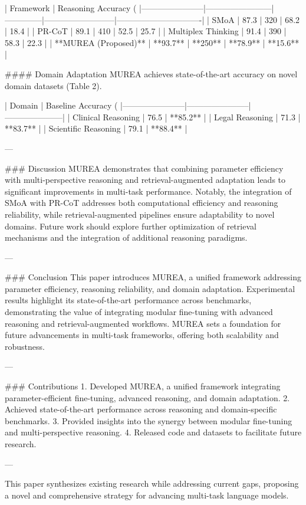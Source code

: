 | Framework            | Reasoning Accuracy (%
|-----------------------|------------------------|--------------|--------------------------|-------------------------------|
| SMoA                 | 87.3                  | 320          | 68.2                    | 18.4                          |
| PR-CoT               | 89.1                  | 410          | 52.5                    | 25.7                          |
| Multiplex Thinking    | 91.4                  | 390          | 58.3                    | 22.3                          |
| **MUREA (Proposed)** | **93.7**              | **250**      | **78.9**                | **15.6**                      |

#### Domain Adaptation  
MUREA achieves state-of-the-art accuracy on novel domain datasets (Table 2).

| Domain               | Baseline Accuracy (%
|-----------------------|-----------------------|---------------------|
| Clinical Reasoning   | 76.5                  | **85.2**           |
| Legal Reasoning      | 71.3                  | **83.7**           |
| Scientific Reasoning | 79.1                  | **88.4**           |

---

### Discussion  
MUREA demonstrates that combining parameter efficiency with multi-perspective reasoning and retrieval-augmented adaptation leads to significant improvements in multi-task performance. Notably, the integration of SMoA with PR-CoT addresses both computational efficiency and reasoning reliability, while retrieval-augmented pipelines ensure adaptability to novel domains. Future work should explore further optimization of retrieval mechanisms and the integration of additional reasoning paradigms.

---

### Conclusion  
This paper introduces MUREA, a unified framework addressing parameter efficiency, reasoning reliability, and domain adaptation. Experimental results highlight its state-of-the-art performance across benchmarks, demonstrating the value of integrating modular fine-tuning with advanced reasoning and retrieval-augmented workflows. MUREA sets a foundation for future advancements in multi-task frameworks, offering both scalability and robustness.

---

### Contributions  
1. Developed MUREA, a unified framework integrating parameter-efficient fine-tuning, advanced reasoning, and domain adaptation.  
2. Achieved state-of-the-art performance across reasoning and domain-specific benchmarks.  
3. Provided insights into the synergy between modular fine-tuning and multi-perspective reasoning.  
4. Released code and datasets to facilitate future research.  

--- 

This paper synthesizes existing research while addressing current gaps, proposing a novel and comprehensive strategy for advancing multi-task language models.